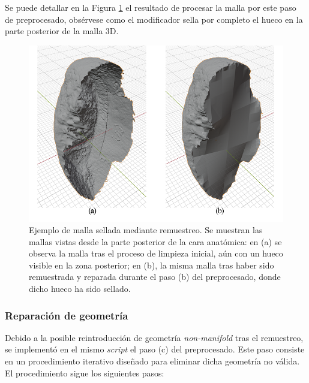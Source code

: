 Se puede detallar en la Figura \ref{remesh_hole_example} el resultado de procesar la malla por este paso de preprocesado, obsérvese como el modificador sella por completo el hueco en la parte posterior de la malla 3D.

\begin{figure}[h]
    \centering
    \includegraphics[width=\linewidth]{figures/4_materials-methods/remesh_hole_filled_example.png}
    \caption[Ejemplo de malla sellada por remuestreo]{Ejemplo de malla sellada mediante remuestreo. Se muestran las mallas vistas desde la parte posterior de la cara anatómica: en (a) se observa la malla tras el proceso de limpieza inicial, aún con un hueco visible en la zona posterior; en (b), la misma malla tras haber sido remuestrada y reparada durante el paso (b) del preprocesado, donde dicho hueco ha sido sellado.}
    \label{remesh_hole_example}
\end{figure}

\subsubsection{Reparación de geometría}
\label{section4:data_repair}
Debido a la posible reintroducción de geometría \textit{non-manifold} tras el remuestreo, se implementó en el mismo \textit{script} el paso (c) del preprocesado. Este paso consiste en un procedimiento iterativo diseñado para eliminar dicha geometría no válida. El procedimiento sigue los siguientes pasos:

